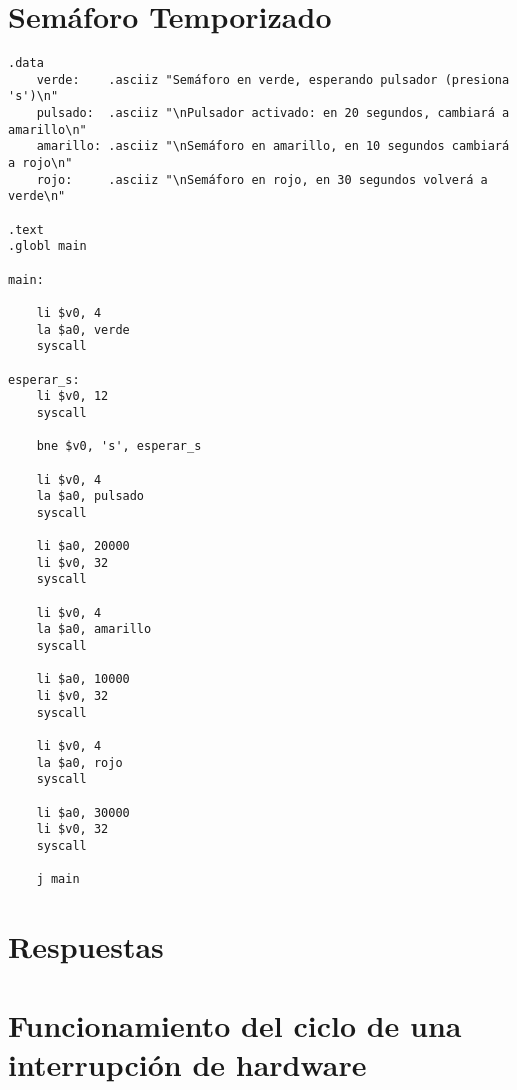\documentclass{article}
\begin{document}
\section*{Semáforo Temporizado}
\begin{lstlisting}
.data
    verde:    .asciiz "Semáforo en verde, esperando pulsador (presiona 's')\n"
    pulsado:  .asciiz "\nPulsador activado: en 20 segundos, cambiará a amarillo\n"
    amarillo: .asciiz "\nSemáforo en amarillo, en 10 segundos cambiará a rojo\n"
    rojo:     .asciiz "\nSemáforo en rojo, en 30 segundos volverá a verde\n"

.text
.globl main

main:
    
    li $v0, 4
    la $a0, verde
    syscall

esperar_s:
    li $v0, 12
    syscall

    bne $v0, 's', esperar_s

    li $v0, 4
    la $a0, pulsado
    syscall

    li $a0, 20000      
    li $v0, 32
    syscall

    li $v0, 4
    la $a0, amarillo
    syscall

    li $a0, 10000    
    li $v0, 32
    syscall

    li $v0, 4
    la $a0, rojo
    syscall

    li $a0, 30000    
    li $v0, 32
    syscall

    j main

\end{lstlisting}

\section*{Respuestas}

\section*{Funcionamiento del ciclo de una interrupción de hardware}
\end{document}
